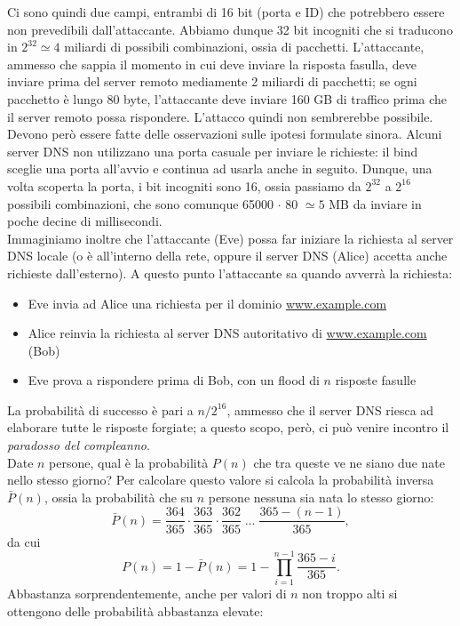 Ci sono quindi due campi, entrambi di 16 bit (porta e ID) che potrebbero essere non prevedibili dall'attaccante. Abbiamo dunque 32 bit incogniti che si traducono in $2^{32} \simeq 4$ miliardi di possibili combinazioni, ossia di pacchetti. L'attaccante, ammesso che sappia il momento in cui deve inviare la risposta fasulla, deve inviare prima del server remoto mediamente 2 miliardi di pacchetti; se ogni pacchetto è lungo 80 byte, l'attaccante deve inviare 160 GB di traffico prima che il server remoto possa rispondere. L'attacco quindi non sembrerebbe possibile.\\
Devono però essere fatte delle osservazioni sulle ipotesi formulate sinora. Alcuni server DNS non utilizzano una porta casuale per inviare le richieste: il bind sceglie una porta all'avvio e continua ad usarla anche in seguito. Dunque, una volta scoperta la porta, i bit incogniti sono 16, ossia passiamo da $2^{32}$ a $2^{16}$ possibili combinazioni, che sono comunque 65000 $\cdot$ 80 $\simeq 5$ MB da inviare in poche decine di millisecondi.\\
Immaginiamo inoltre che l'attaccante (Eve) possa far iniziare la richiesta al server DNS locale (o è all'interno della rete, oppure il server DNS (Alice) accetta anche richieste dall'esterno). A questo punto l'attaccante sa quando avverrà la richiesta:
\begin{itemize}
	\item Eve invia ad Alice una richiesta per il dominio \url{www.example.com}
	\item Alice reinvia la richiesta al server DNS autoritativo di \url{www.example.com} (Bob)
	\item Eve prova a rispondere prima di Bob, con un flood di $n$ risposte fasulle
\end{itemize}
La probabilità di successo è pari a $n/2^{16}$, ammesso che il server DNS riesca ad elaborare tutte le risposte forgiate; a questo scopo, però, ci può venire incontro il \textit{paradosso del compleanno}.\\
Date $n$ persone, qual è la probabilità $P(n)$ che tra queste ve ne siano due nate nello stesso giorno? Per calcolare questo valore si calcola la probabilità inversa $\bar{P}(n)$, ossia la probabilità che su $n$ persone nessuna sia nata lo stesso giorno:
$$\bar{P}(n) = \frac{364}{365}\cdot\frac{363}{365}\cdot\frac{362}{365}\;\ldots\;\frac{365-(n-1)}{365},$$
da cui
$$P(n) = 1-\bar{P}(n) = 1-\prod_{i=1}^{n-1}\frac{365-i}{365}.$$
Abbastanza sorprendentemente, anche per valori di $n$ non troppo alti si ottengono delle probabilità abbastanza elevate:
